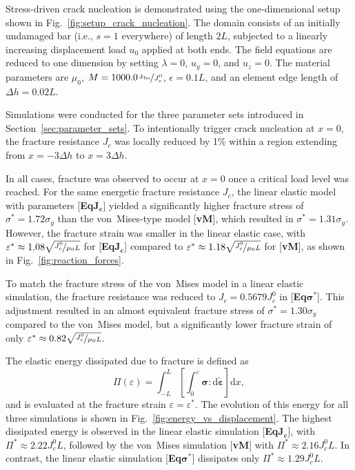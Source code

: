 \documentclass[pdflatex,sn-mathphys-num]{sn-jnl}%
\newcommand{\vMLabel}{[\textbf{vM}]\xspace}
\newcommand{\EqJcLabel}{[\textbf{Eq$\boldsymbol{J_c}$}]\xspace}
\newcommand{\EqSigmaStarLabel}{[\textbf{Eq$\boldsymbol{\sigma^*}$}]\xspace}
\theoremstyle{thmstyleone}%
\theoremstyle{thmstyletwo}%
\theoremstyle{thmstylethree}%
\begin{document}
Stress-driven crack nucleation is demonstrated using the one-dimensional setup shown in Fig.~\ref{fig:setup_crack_nucleation}. The domain consists of an initially undamaged bar (i.e., $s = 1$ everywhere) of length $2L$, subjected to a linearly increasing displacement load $u_0$ applied at both ends. The field equations are reduced to one dimension by setting $\lambda = 0$, $u_y = 0$, and $u_z = 0$. The material parameters are $\mu_0$, $M = 1000.0\,\nicefrac{\dot{x}_{\text{bc}}}{J_c^0}$, $\epsilon = 0.1L$, and an element edge length of $\Delta h = 0.02L$.

Simulations were conducted for the three parameter sets introduced in Section~\ref{sec:parameter_sets}. To intentionally trigger crack nucleation at $x = 0$, the fracture resistance $J_c$ was locally reduced by 1\% within a region extending from $x=-3\Delta h$ to $x=3\Delta h$.

In all cases, fracture was observed to occur at $x = 0$ once a critical load level was 
reached. For the same energetic fracture resistance $J_c$, the linear elastic model with parameters \EqJcLabel yielded a significantly higher fracture stress of $\sigma^* = 1.72\sigma_y$ than the von~Mises-type model \vMLabel, which resulted in $\sigma^* = 1.31\sigma_y$. However, the fracture strain was smaller in the linear elastic case, with $\varepsilon^* \approx 1.08\sqrt{\nicefrac{J_c^0}{\mu_0 L}}$ for \EqJcLabel compared to $\varepsilon^* \approx 1.18\sqrt{\nicefrac{J_c^0}{\mu_0 L}}$ for \vMLabel, as shown in Fig.~\ref{fig:reaction_forces}.

To match the fracture stress of the von~Mises model in a linear elastic simulation, the fracture resistance was reduced to $J_c = 0.5679J_c^0$ in \EqSigmaStarLabel. This adjustment resulted in an almost equivalent fracture stress of $\sigma^* = 1.30\sigma_y$ compared to the von~Mises model, but a significantly lower fracture strain of only $\varepsilon^* \approx 0.82\sqrt{\nicefrac{J_c^0}{\mu_0 L}}$.

The elastic energy dissipated due to fracture is defined as
\begin{equation}
   \Pi(\varepsilon) = \int_{-L}^{L}
   \left[\int_{0}^{\varepsilon} \boldsymbol{\sigma} :
   \mathrm{d}\tilde{\boldsymbol{\varepsilon}}\right] \mathrm{d}x,
   \label{eq:total_energy}
\end{equation}
and is evaluated at the fracture strain $\varepsilon = \varepsilon^*$. The evolution of this energy for all three simulations is shown in Fig.~\ref{fig:energy_vs_displacement}. The highest dissipated energy is observed in the linear elastic simulation \EqJcLabel, with $\Pi^* \approx 2.22J_c^0 L$, followed by the von~Mises simulation \vMLabel with $\Pi^* \approx 2.16J_c^0 L$. In contrast, the linear elastic simulation \EqSigmaStarLabel dissipates only $\Pi^* \approx 1.29J_c^0 L$.
\end{document}
